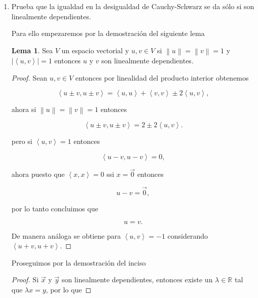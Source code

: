 \documentclass[letterpaper]{article}
\theoremstyle{definition}
\theoremstyle{lemathm}
\newtheorem{lema}{Lema}
\theoremstyle{lemathm}
\theoremstyle{lemathm}
\theoremstyle{lemademthm}
\newcommand{\inprod}[1]{\left\langle #1 \right\rangle }
\newcommand{\norm}[1]{\left\lVert#1\right\rVert}
\newcommand{\RR}{\mathbb{R}}
\newcommand{\1}{\mathbbm{1}}
\begin{document}
\begin{enumerate}
\begin{enumerate}
\begin{proof}
				\[\norm{V-\inprod{U,V}U}^2 = \norm{V}^2 - \inprod{U,V}^2,\]

				entonces

				\[\norm{V-\inprod{U,V}U}^2 = \norm{V}^2 - \norm{U}^2\norm{V}^2 =  \norm{V}^2 - \norm{V}^2 = 0.\]

				Al ser norma positiva definida obtenemos

				\[V-\inprod{U,V}U = 0,\]

				por lo tanto concluimos que

				\[V = \inprod{U,V}U.\]

			\end{proof}
			\item Prueba que la igualdad en la desigualdad de Cauchy-Schwarz se da sólo si son linealmente dependientes.
			
			Para ello empezaremos por la demostración del siguiente lema
			
			\begin{lema}
				Sea $V$ un espacio vectorial y $u,v \in V$ si $\norm{u} = \norm{v} = 1$ y $|\inprod{u,v}| = 1$ entonces $u$ y $v$ son linealmente dependientes.
			\end{lema}
	
			\begin{proof}
				Sean $u,v\in V$ entonces por linealidad del producto interior obtenemos
	
				\[\inprod{u\pm v,u\pm v} = \inprod{u,u}+\inprod{v,v} \pm 2\inprod{u,v},\]
	
				ahora si $\norm{u} = \norm{v} = 1$ entonces
	
				\[\inprod{u\pm v,u\pm v} = 2 \pm 2\inprod{u,v}.\]
	
				pero si $\inprod{u,v} = 1$ entonces
	
				\[\inprod{u-v,u-v} = 0,\]
	
				ahora puesto que $\inprod{x,x} = 0$ ssi $x=\vec{0}$ entonces
	
				\[u-v = \vec{0},\]
	
				por lo tanto concluimos que
	
				\[u = v.\]
	
				De manera análoga se obtiene para $\inprod{u,v} = -1$ considerando $\inprod{u+v,u+v}$.
	
			\end{proof}

			Proseguimos por la demostración del inciso

			\begin{proof}
				Si $\vec{x}$ y $\vec{y}$ son linealmente dependientes, entonces existe un $\lambda\in\RR$ tal que $\lambda x = y$, por lo que


\end{proof}
\end{enumerate}
\end{enumerate}
\end{document}
